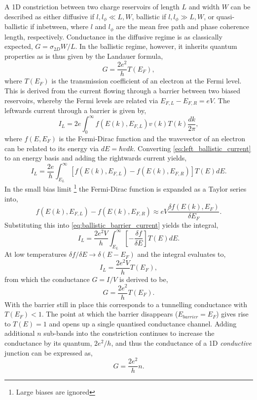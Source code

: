 \documentclass[12pt, a4paper, oneside]{book}
\begin{document}
A 1D constriction between two charge reservoirs of length $L$ and width $W$ can be described as either diffusive if $l,l_\phi \ll L,W$, ballistic if $l,l_\phi \gg L,W$, or quasi-ballistic if inbetween, where $l$ and $l_\phi$ are the mean free path and phase coherence length, respectively. Conductance in the diffusive regime is as classically expected, $G=\sigma_{2D}W/L$. In the ballistic regime, however, it inherits quantum properties as is thus given by the Landauer formula,
\begin{equation} G=\frac{2e^2}{h}T(E_F), \end{equation}
where $T(E_F)$ is the transmission coefficient of an electron at the Fermi level. This is derived from the current flowing through a barrier between two biased reservoirs, whereby the Fermi levels are related via $E_{F,L} - E_{F,R} = eV$. The leftwards current through a barrier is given by,
\begin{equation}
	I_L = 2e \int_0^\infty f(E(k), E_{F,L}) v(k) T(k) \frac{dk}{2\pi},
	\label{eq:left_ballistic_current}
\end{equation}
where $f(E, E_F)$ is the Fermi-Dirac function and the wavevector of an electron can be related to its energy via $dE = \hbar v dk$. Converting \eqref{eq:left_ballistic_current} to an energy basis and adding the rightwards current yields,
\begin{equation}
	I_L = \frac{2e}{h} \int_{E_{L}}^\infty \left[ f(E(k), E_{F,L}) - f(E(k), E_{F,R}) \right] T(E) dE.
	\label{eq:ballistic_barrier_current}
\end{equation}
In the small bias limit%
\footnote{Large biases are ignored}
the Fermi-Dirac function is expanded as a Taylor series into,
\begin{equation}
	f(E(k), E_{F,L}) - f(E(k), E_{F,R}) \approx eV \frac{\delta f(E(k), E_F)}{\delta E_F}.
\end{equation}
Substituting this into \eqref{eq:ballistic_barrier_current} yields the integral,
\begin{equation}
	I_L = \frac{2e^2V}{h} \int_{E_{L}}^\infty \left[ -\frac{\delta f}{\delta E} \right] T(E) dE.
\end{equation}
At low temperatures $\delta f/\delta E \rightarrow \delta(E-E_F)$ and the integral evaluates to,
\begin{equation}
	I_L = \frac{2e^2V}{h}T(E_F),
\end{equation}
from which the conductance $G=I/V$ is derived to be,
\begin{equation}
		G = \frac{2e^2}{h}T(E_F).
\end{equation}
With the barrier still in place this corresponds to a tunnelling conductance with $T(E_F)<1$. The point at which the barrier disappears ($E_{barrier} = E_F$) gives rise to $T(E) = 1$ and opens up a single quantised conductance channel. Adding additional $n$ sub-bands into the constriction continues to increase the conductance by its quantum, $2e^2/h$, and thus the conductance of a 1D \emph{conductive} junction can be expressed as,
\begin{equation}
	G = \frac{2e^2}{h}n.
\end{equation}
\end{document}
